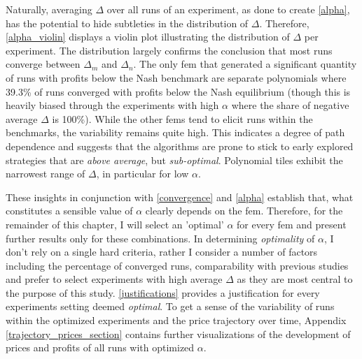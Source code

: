 Naturally, averaging $\Delta$ over all runs of an experiment, as done to create \autoref{alpha},  has the potential to hide subtleties in the distribution of $\Delta$. Therefore, \autoref{alpha_violin} displays a violin plot illustrating the distribution of $\Delta$ per experiment. The distribution largely confirms the conclusion that most runs converge between $\Delta_m$ and $\Delta_n$. The only \gls{fem} that generated a significant quantity of runs with profits below the Nash benchmark are separate polynomials where 39.3\% of runs converged with profits below the Nash equilibrium (though this is heavily biased through the experiments with high $\alpha$ where the share of negative average $\Delta$ is 100\%). While the other \gls{fem}s tend to elicit runs within the benchmarks, the variability remains quite high. This indicates a degree of path dependence and suggests that the algorithms are prone to stick to early explored strategies that are \emph{above average}, but \emph{sub-optimal}. Polynomial tiles exhibit the narrowest range of $\Delta$, in particular for low $\alpha$.

These insights in conjunction with \autoref{convergence} and \autoref{alpha} establish that, what constitutes a sensible value of $\alpha$ clearly depends on the \gls{fem}. Therefore, for the remainder of this chapter, I will select an 'optimal' $\alpha$ for every \gls{fem} and present further results only for these combinations. In determining \emph{optimality} of $\alpha$, I don't rely on a single hard criteria, rather I consider a number of factors including the percentage of converged runs, comparability with previous studies and prefer to select experiments with high average $\Delta$ as they are most central to the purpose of this study. \autoref{justifications} provides a justification for every experiments setting deemed \emph{optimal}. To get a sense of the variability of runs within the optimized experiments and the price trajectory over time, Appendix \ref{trajectory_prices_section} contains further visualizations of the development of prices and profits of all runs with optimized $\alpha$.


